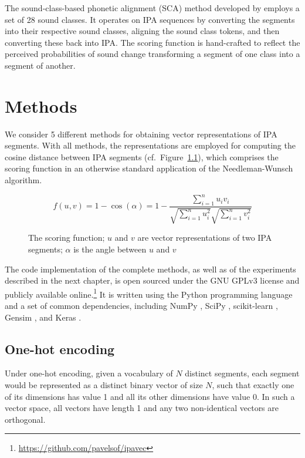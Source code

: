 \documentclass[a4paper]{report}
\begin{document}
The sound-class-based phonetic alignment (SCA) method developed by \citet{2012_List} employs a set of 28 sound classes.
It operates on IPA sequences by converting the segments into their respective sound classes, aligning the sound class tokens, and then converting these back into IPA.
The scoring function is hand-crafted to reflect the perceived probabilities of sound change transforming a segment of one class into a segment of another.


\chapter{Methods}

We consider 5 different methods for obtaining vector representations of IPA segments.
With all methods, the representations are employed for computing the cosine distance between IPA segments (cf.~Figure~\ref{fig:cosine}),
which comprises the scoring function in an otherwise standard application of the Needleman-Wunsch algorithm.

\begin{figure}[h]
	\begin{displaymath}
		f(u, v) = 1-\cos(\alpha) = 1-\frac{\displaystyle\sum_{i=1}^n u_i v_i}{\sqrt{\displaystyle\sum_{i=1}^n u_i^2}\sqrt{\displaystyle\sum_{i=1}^n v_i^2}}
	\end{displaymath}

	\caption{The scoring function; $u$ and $v$ are vector representations of two IPA segments; $\alpha$ is the angle between $u$ and $v$}
	\label{fig:cosine}
\end{figure}

The code implementation of the complete methods, as well as of the experiments described in the next chapter,
is open sourced under the GNU GPLv3 license and publicly available online.\footnote{\url{https://github.com/pavelsof/ipavec}}
It is written using the Python programming language and a set of common dependencies,
including NumPy \citep{2011_Walt_al},
SciPy \citep{2001_Jones_al},
scikit-learn \citep{2011_Pedregosa_al},
Gensim \citep{2010_Řehůřek_Sojka},
and Keras \citep{2015_Chollet_al}.


\section{One-hot encoding}

Under one-hot encoding, given a vocabulary of $N$ distinct segments, each segment would be represented as a distinct binary vector of size $N$,
such that exactly one of its dimensions has value 1 and all its other dimensions have value 0.
In such a vector space, all vectors have length 1 and any two non-identical vectors are orthogonal.
\end{document}
